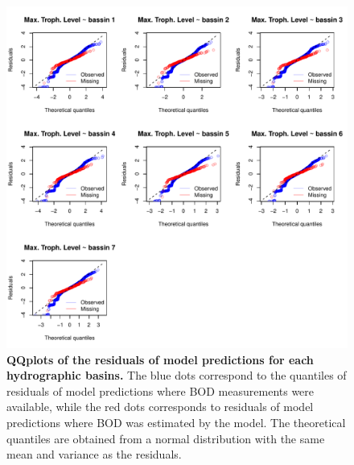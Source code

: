 \documentclass[11pt, oneside]{article}
\begin{document}
\begin{figure}[H]
\begin{center}
\includegraphics[page=1, width=1\linewidth]{b0_6_2/out_mTL/fig_qqplot_residuals.pdf}
\caption{
    \textbf{QQplots of the residuals of model predictions for each hydrographic basins.}
    The blue dots correspond to the quantiles of residuals of model predictions where BOD measurements were available, while the red dots corresponds to residuals of model predictions where BOD was estimated by the model.
    The theoretical quantiles are obtained from a normal distribution with the same mean and variance as the residuals.
} 
\end{center}
\end{figure}
\end{document}
